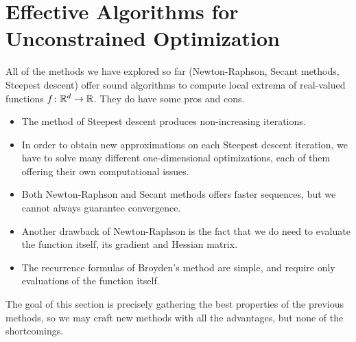 
\section{Effective Algorithms for Unconstrained Optimization}
All of the methods we have explored so far (Newton-Raphson, Secant methods, Steepest descent) offer sound algorithms to compute local extrema of real-valued functions $f \colon \mathbb{R}^d \to \mathbb{R}$. They do have some pros and cons.  
\begin{itemize}
	\item The method of Steepest descent produces non-increasing iterations.
	\item In order to obtain new approximations on each Steepest descent iteration, we have to solve many different one-dimensional optimizations, each of them offering their own computational issues. 
	\item Both Newton-Raphson and Secant methods offers faster sequences, but we cannot always guarantee convergence.  
	\item Another drawback of Newton-Raphson is the fact that we do need to evaluate the function itself, its gradient and Hessian matrix. 
	\item The recurrence formulas of Broyden's method are simple, and require only evaluations of the function itself.
\end{itemize}

The goal of this section is precisely gathering the best properties of the previous methods, so we may craft new methods with all the advantages, but none of the shortcomings.  

\separator


